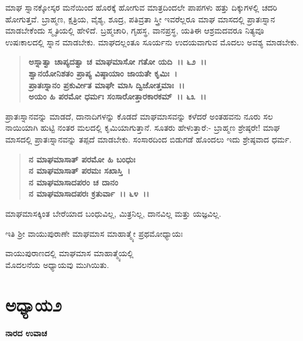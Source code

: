 ಮಾಘ ಸ್ನಾನಕ್ಕೋಸ್ಕರ ಮನೆಯಿಂದ ಹೊರಕ್ಕೆ ಹೋಗುವ ಮಾತ್ರದಿಂದಲೇ ಪಾಪಗಳು ಹತ್ತು ದಿಕ್ಕುಗಳಲ್ಲಿ ಚದರಿ ಹೋಗುತ್ತವೆ. ಬ್ರಾಹ್ಮಣ, ಕ್ಷತ್ರಿಯ, ವೈಶ್ಯ, ಶೂದ್ರ, ಪತಿವ್ರತಾ ಸ್ತ್ರೀ ಇವರೆಲ್ಲರೂ ಮಾಘ ಮಾಸದಲ್ಲಿ ಪ್ರಾತಃಸ್ನಾನ ಮಾಡಬೇಕೆಂದು ಸ್ಮೃತಿಯಲ್ಲಿ ಹೇಳಿದೆ. ಬ್ರಹ್ಮಚಾರಿ, ಗೃಹಸ್ಥ, ವಾನಪ್ರಸ್ಥ, ಯತಿ\enginline{-}ಈ ಆಶ್ರಮದವರೂ ನಿತ್ಯವೂ ಉಷಃಕಾಲದಲ್ಲಿ ಸ್ನಾನ ಮಾಡಬೇಕು. ಮಾಘದಲ್ಲಂತೂ ಸೂರ್ಯನು ಉದಯವಾಗುವ ಮೊದಲು ಅವಶ್ಯ ಮಾಡಬೇಕು.

\begin{verse}
\textbf{ಅಸ್ನಾತ್ವಾ ಚಾಪ್ಯದತ್ವಾ ಚ ಮಾಘಮಾಸೋ ಗತೋ ಯದಿ~।। ೬೨~।।}\\\textbf{ಶ್ವಾನಯೋನಿಶತಂ ಪ್ರಾಪ್ಯ ವಿಷ್ಠಾಯಾಂ ಜಾಯತೇ ಕೃಮಿಃ~।}\\\textbf{ಪ್ರಾತಃಸ್ನಾನಂ ಪ್ರಕುರ್ವೀತ ಮಾಘೇ ಮಾಸಿ ದ್ವಿಜೋತ್ತಮಾಃ~।।} \\\textbf{ಅಯಂ ಹಿ ಪರಮೋ ಧರ್ಮಃ ಸಂಸಾರೋತ್ತಾರಕಾರಕಮ್~।। ೬೩~।।}
\end{verse}

ಪ್ರಾತಃಸ್ನಾನವನ್ನು ಮಾಡದೆ, ದಾನಾದಿಗಳನ್ನು ಕೊಡದೆ ಮಾಘಮಾಸವನ್ನು ಕಳೆದರೆ ಅಂತಹವನು ನೂರು ಸಲ ನಾಯಿಯಾಗಿ ಹುಟ್ಟಿ ನಂತರ ಮಲದಲ್ಲಿ ಕೃಮಿಯಾಗುತ್ತಾನೆ. ಸೂತರು ಹೇಳುತ್ತಾರೆ:- ಬ್ರಾಹ್ಮಣ ಶ್ರೇಷ್ಠರೇ! ಮಾಘ ಮಾಸದಲ್ಲಿ ಪ್ರಾತಃಸ್ನಾನವನ್ನು ತಪ್ಪದೆ ಮಾಡಬೇಕು. ಸಂಸಾರದಿಂದ ಬಿಡುಗಡೆ ಹೊಂದಲು ಇದು ಶ್ರೇಷ್ಠವಾದ ಧರ್ಮ.

\begin{verse}
\textbf{ನ ಮಾಘಮಾಸಾತ್ ಪರಮೋ ಹಿ ಬಂಧುಃ}\\\textbf{ನ ಮಾಘಮಾಸಾತ್ ಪರಮಃ ಸಖಾಸ್ತಿ~।}\\\textbf{ನ ಮಾಘಮಾಸಾದಪರಂ ಚ ದಾನಂ} \\\textbf{ನ ಮಾಘಮಾಸಾದಪರಃ ಕ್ರತುರ್ವಾ~।। ೬೪~।। }
\end{verse}

ಮಾಘಮಾಸಕ್ಕಿಂತ ಬೇರೆಯಾದ ಬಂಧುವಿಲ್ಲ, ಮಿತ್ರನಿಲ್ಲ, ದಾನವಿಲ್ಲ ಮತ್ತು ಯಜ್ಞವಿಲ್ಲ.

\begin{center}
ಇತಿ ಶ‍್ರೀ ವಾಯುಪುರಾಣೇ ಮಾಘಮಾಸ ಮಾಹಾತ್ಮ್ಯೇ ಪ್ರಥಮೋಧ್ಯಾಯಃ
\end{center}

\begin{center}
ವಾಯುಪುರಾಣದಲ್ಲಿ ಮಾಘಮಾಸ ಮಾಹಾತ್ಮ್ಯೆಯಲ್ಲಿ \\ ಮೊದಲನೆಯ ಅಧ್ಯಾಯವು ಮುಗಿಯಿತು.
\end{center}

\newpage

\section*{ಅಧ್ಯಾಯ\enginline{-}೨}

\emptypage

\begin{flushleft}
\textbf{ನಾರದ ಉವಾಚ\enginline{-}}
\end{flushleft}

